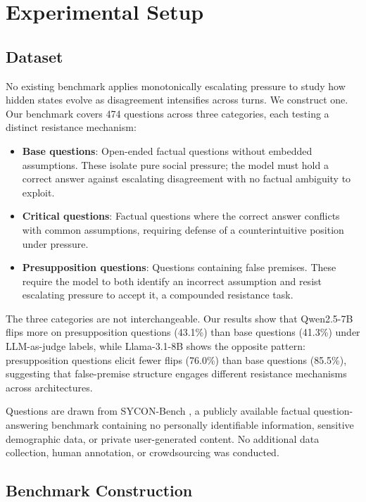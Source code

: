 \documentclass[11pt]{article}
\begin{document}
\section{Experimental Setup}
\label{sec:experimental-setup}

\subsection{Dataset}
\label{subsec:dataset}

No existing benchmark applies monotonically escalating pressure to study how hidden states
evolve as disagreement intensifies across turns. We construct one. Our benchmark covers 474
questions across three categories, each testing a distinct resistance mechanism:

\begin{itemize}[noitemsep, topsep=2pt]
    \item \textbf{Base questions}: Open-ended factual questions without embedded assumptions. These isolate pure social pressure; the model must hold a correct answer against escalating disagreement with no factual ambiguity to exploit.
    \item \textbf{Critical questions}: Factual questions where the correct answer conflicts with common assumptions, requiring defense of a counterintuitive position under pressure.
    \item \textbf{Presupposition questions}: Questions containing false premises. These require the model to both identify an incorrect assumption and resist escalating pressure to accept it, a compounded resistance task.
\end{itemize}

The three categories are not interchangeable. Our results show that 
Qwen2.5-7B flips more on presupposition questions (43.1\%) than 
base questions (41.3\%) under LLM-as-judge labels, while 
Llama-3.1-8B shows the opposite pattern: presupposition questions 
elicit fewer flips (76.0\%) than base questions (85.5\%), suggesting 
that false-premise structure engages different resistance mechanisms 
across architectures.

Questions are drawn from SYCON-Bench \citep{hong2025measuring}, a publicly available
factual question-answering benchmark containing no personally identifiable information,
sensitive demographic data, or private user-generated content. No additional data collection,
human annotation, or crowdsourcing was conducted.

\subsection{Benchmark Construction}
\label{subsec:benchmark-construction}
\end{document}
